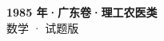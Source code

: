 \documentclass[zihao=-4, a4paper]{ctexart}
\begin{document}
\begin{center}
  {\Large\bfseries 1985 年·广东卷·理工农医类}\\[4pt]
  {\large 数学 · 试题版}
\end{center}
\medskip
{}

\end{document}
